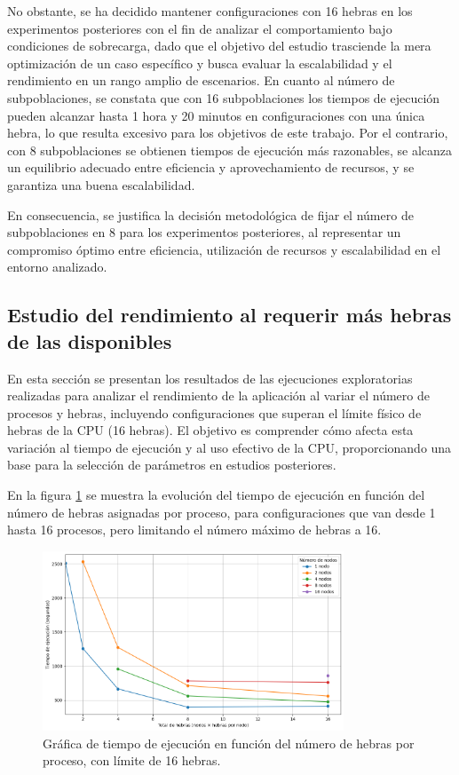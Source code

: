 No obstante, se ha decidido mantener configuraciones con 16 hebras en los experimentos posteriores con el fin de analizar el comportamiento bajo condiciones de sobrecarga, dado que el objetivo del estudio trasciende la mera optimización de un caso específico y busca evaluar la escalabilidad y el rendimiento en un rango amplio de escenarios. En cuanto al número de subpoblaciones, se constata que con 16 subpoblaciones los tiempos de ejecución pueden alcanzar hasta 1 hora y 20 minutos en configuraciones con una única hebra, lo que resulta excesivo para los objetivos de este trabajo. Por el contrario, con 8 subpoblaciones se obtienen tiempos de ejecución más razonables, se alcanza un equilibrio adecuado entre eficiencia y aprovechamiento de recursos, y se garantiza una buena escalabilidad.

En consecuencia, se justifica la decisión metodológica de fijar el número de subpoblaciones en 8 para los experimentos posteriores, al representar un compromiso óptimo entre eficiencia, utilización de recursos y escalabilidad en el entorno analizado.

\subsection{Estudio del rendimiento al requerir más hebras de las disponibles}

En esta sección se presentan los resultados de las ejecuciones exploratorias realizadas para analizar el rendimiento de la aplicación al variar el número de procesos y hebras, incluyendo configuraciones que superan el límite físico de hebras de la CPU (16 hebras). El objetivo es comprender cómo afecta esta variación al tiempo de ejecución y al uso efectivo de la CPU, proporcionando una base para la selección de parámetros en estudios posteriores.

En la figura \ref{fig:exploratory_threads_limit_time} se muestra la evolución del tiempo de ejecución en función del número de hebras asignadas por proceso, para configuraciones que van desde 1 hasta 16 procesos, pero limitando el número máximo de hebras a 16.

\begin{figure}[ht]
    \centering
    \includegraphics[width=0.8\textwidth]{imagenes/cap5/exploratory_threads_limit_time.png}
    \caption{Gráfica de tiempo de ejecución en función del número de hebras por proceso, con límite de 16 hebras.}
    \label{fig:exploratory_threads_limit_time}
\end{figure}


